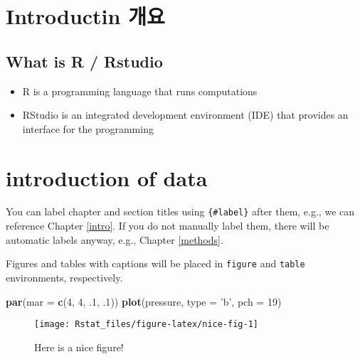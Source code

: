 \documentclass[]{book}
\newenvironment{Shaded}{\begin{snugshade}}{\end{snugshade}}
\newcommand{\KeywordTok}[1]{\textcolor[rgb]{0.13,0.29,0.53}{\textbf{#1}}}
\newcommand{\DataTypeTok}[1]{\textcolor[rgb]{0.13,0.29,0.53}{#1}}
\newcommand{\DecValTok}[1]{\textcolor[rgb]{0.00,0.00,0.81}{#1}}
\newcommand{\FloatTok}[1]{\textcolor[rgb]{0.00,0.00,0.81}{#1}}
\newcommand{\StringTok}[1]{\textcolor[rgb]{0.31,0.60,0.02}{#1}}
\newcommand{\NormalTok}[1]{#1}
\providecommand{\tightlist}{%
  \setlength{\itemsep}{0pt}\setlength{\parskip}{0pt}}
\begin{document}
\hypertarget{introductin-}{%
\chapter{Introductin 개요}\label{introductin-}}

\hypertarget{what-is-r-rstudio}{%
\section{What is R / Rstudio}\label{what-is-r-rstudio}}

\begin{itemize}
\tightlist
\item
  R is a programming language that runs computations
\item
  RStudio is an integrated development environment (IDE) that provides an interface for the programming
\end{itemize}

\hypertarget{introduction-of-data}{%
\chapter{introduction of data}\label{introduction-of-data}}

You can label chapter and section titles using \texttt{\{\#label\}} after them, e.g., we can reference Chapter \ref{intro}. If you do not manually label them, there will be automatic labels anyway, e.g., Chapter \ref{methods}.

Figures and tables with captions will be placed in \texttt{figure} and \texttt{table} environments, respectively.

\begin{Shaded}
\begin{Highlighting}[]
\KeywordTok{par}\NormalTok{(}\DataTypeTok{mar =} \KeywordTok{c}\NormalTok{(}\DecValTok{4}\NormalTok{, }\DecValTok{4}\NormalTok{, }\FloatTok{.1}\NormalTok{, }\FloatTok{.1}\NormalTok{))}
\KeywordTok{plot}\NormalTok{(pressure, }\DataTypeTok{type =} \StringTok{'b'}\NormalTok{, }\DataTypeTok{pch =} \DecValTok{19}\NormalTok{)}
\end{Highlighting}
\end{Shaded}

\begin{figure}

{\centering \texttt{[image: Rstat\_files/figure-latex/nice-fig-1]} 

}

\caption{Here is a nice figure!}\label{fig:nice-fig}
\end{figure}
\end{document}
